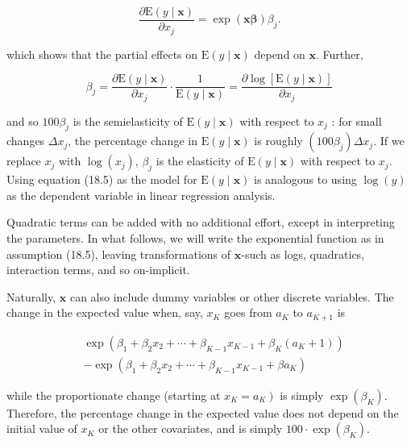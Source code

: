 \documentclass[10pt]{article}
\begin{document}
$$
\frac{\partial \mathrm{E}(y \mid \mathbf{x})}{\partial x_{j}}=\exp (\mathbf{x} \boldsymbol{\beta}) \beta_{j} .
$$

which shows that the partial effects on $\mathrm{E}(y \mid \mathbf{x})$ depend on $\mathbf{x}$. Further,

$$
\beta_{j}=\frac{\partial \mathrm{E}(y \mid \mathbf{x})}{\partial x_{j}} \cdot \frac{1}{\mathrm{E}(y \mid \mathbf{x})}=\frac{\partial \log [\mathrm{E}(y \mid \mathbf{x})]}{\partial x_{j}}
$$

and so $100 \beta_{j}$ is the semielasticity of $\mathrm{E}(y \mid \mathbf{x})$ with respect to $x_{j}$ : for small changes $\Delta x_{j}$, the percentage change in $\mathrm{E}(y \mid \mathbf{x})$ is roughly $\left(100 \beta_{j}\right) \Delta x_{j}$. If we replace $x_{j}$ with $\log \left(x_{j}\right)$, $\beta_{j}$ is the elasticity of $\mathrm{E}(y \mid \mathbf{x})$ with respect to $x_{j}$. Using equation (18.5) as the model for $\mathrm{E}(y \mid \mathbf{x})$ is analogous to using $\log (y)$ as the dependent variable in linear regression analysis.

Quadratic terms can be added with no additional effort, except in interpreting the parameters. In what follows, we will write the exponential function as in assumption (18.5), leaving transformations of $\mathbf{x}$-such as logs, quadratics, interaction terms, and so on-implicit.

Naturally, $\mathbf{x}$ can also include dummy variables or other discrete variables. The change in the expected value when, say, $x_{K}$ goes from $a_{K}$ to $a_{K+1}$ is

$$
\begin{aligned}
& \exp \left(\beta_{1}+\beta_{2} x_{2}+\cdots+\beta_{K-1} x_{K-1}+\beta_{K}\left(a_{K}+1\right)\right) \\
& -\exp \left(\beta_{1}+\beta_{2} x_{2}+\cdots+\beta_{K-1} x_{K-1}+\beta a_{K}\right)
\end{aligned}
$$

while the proportionate change (starting at $\left.x_{K}=a_{K}\right)$ is simply $\exp \left(\beta_{K}\right)$. Therefore, the percentage change in the expected value does not depend on the initial value of $x_{K}$ or the other covariates, and is simply $100 \cdot \exp \left(\beta_{K}\right)$.
\end{document}
